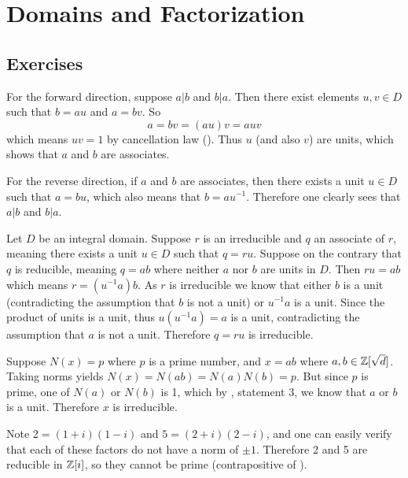 \section{Domains and Factorization}
\subsection*{Exercises}
\begin{questions}
    \item For the forward direction, suppose $a \vert b$ and $b \vert a$. Then there exist elements $u, v \in D$ such that $b = au$ and $a = bv$. So
    \[
        a = bv = (au)v = auv
    \]
    which means $uv = 1$ by cancellation law (). Thus $u$ (and also $v$) are units, which shows that $a$ and $b$ are associates.

    For the reverse direction, if $a$ and $b$ are associates, then there exists a unit $u \in D$ such that $a = bu$, which also means that $b = au^{-1}$. Therefore one clearly sees that $a \vert b$ and $b \vert a$.

    \item Let $D$ be an integral domain. Suppose $r$ is an irreducible and $q$ an associate of $r$, meaning there exists a unit $u \in D$ such that $q = ru$. Suppose on the contrary that $q$ is reducible, meaning $q = ab$ where neither $a$ nor $b$ are units in $D$. Then $ru = ab$ which means $r = (u^{-1}a)b$. As $r$ is irreducible we know that either $b$ is a unit (contradicting the assumption that $b$ is not a unit) or $u^{-1}a$ is a unit. Since the product of units is a unit, thus $u(u^{-1}a) = a$ is a unit, contradicting the assumption that $a$ is not a unit. Therefore $q = ru$ is irreducible.

    \item Suppose $N(x) = p$ where $p$ is a prime number, and $x = ab$ where $a,b \in \mathbb{Z}[\sqrt{d}]$. Taking norms yields $N(x) = N(ab) = N(a)N(b) = p$. But since $p$ is prime, one of $N(a)$ or $N(b)$ is 1, which by , statement 3, we know that $a$ or $b$ is a unit. Therefore $x$ is irreducible.

    \item \begin{partquestions}{\alph*}
        \item Note $2 = (1+i)(1-i)$ and $5 = (2+i)(2-i)$, and one can easily verify that each of these factors do not have a norm of $\pm1$. Therefore 2 and 5 are reducible in $\mathbb{Z}[i]$, so they cannot be prime (contrapositive of ).


\end{partquestions}
\end{questions}
